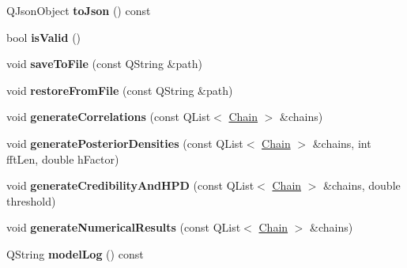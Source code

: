 \begin{DoxyCompactItemize}
\item 
\hypertarget{class_model_ac394ce8372c50c938fb02ac95eefd0e4}{Q\-Json\-Object {\bfseries to\-Json} () const }\label{class_model_ac394ce8372c50c938fb02ac95eefd0e4}

\item 
\hypertarget{class_model_a98be7c2792a3fd739a494bb4e0a320aa}{bool {\bfseries is\-Valid} ()}\label{class_model_a98be7c2792a3fd739a494bb4e0a320aa}

\item 
\hypertarget{class_model_acd72fd7614bfd19e7634144375cdc144}{void {\bfseries save\-To\-File} (const Q\-String \&path)}\label{class_model_acd72fd7614bfd19e7634144375cdc144}

\item 
\hypertarget{class_model_adfb503a10092f937c101c58d36348273}{void {\bfseries restore\-From\-File} (const Q\-String \&path)}\label{class_model_adfb503a10092f937c101c58d36348273}

\item 
\hypertarget{class_model_a653bb8a5fe2fa74f900abc16ace39b8a}{void {\bfseries generate\-Correlations} (const Q\-List$<$ \hyperlink{struct_chain}{Chain} $>$ \&chains)}\label{class_model_a653bb8a5fe2fa74f900abc16ace39b8a}

\item 
\hypertarget{class_model_a38dc61f40b8e61b242ca715926afe749}{void {\bfseries generate\-Posterior\-Densities} (const Q\-List$<$ \hyperlink{struct_chain}{Chain} $>$ \&chains, int fft\-Len, double h\-Factor)}\label{class_model_a38dc61f40b8e61b242ca715926afe749}

\item 
\hypertarget{class_model_ac5253693f6f76c94756b9564ec27a321}{void {\bfseries generate\-Credibility\-And\-H\-P\-D} (const Q\-List$<$ \hyperlink{struct_chain}{Chain} $>$ \&chains, double threshold)}\label{class_model_ac5253693f6f76c94756b9564ec27a321}

\item 
\hypertarget{class_model_a5a598dd1b25d69c040fae6e140d0bef0}{void {\bfseries generate\-Numerical\-Results} (const Q\-List$<$ \hyperlink{struct_chain}{Chain} $>$ \&chains)}\label{class_model_a5a598dd1b25d69c040fae6e140d0bef0}

\item 
\hypertarget{class_model_a3bb0f0a80a5d5110c6874584fdb2ccb0}{Q\-String {\bfseries model\-Log} () const }\label{class_model_a3bb0f0a80a5d5110c6874584fdb2ccb0}

\end{DoxyCompactItemize}
